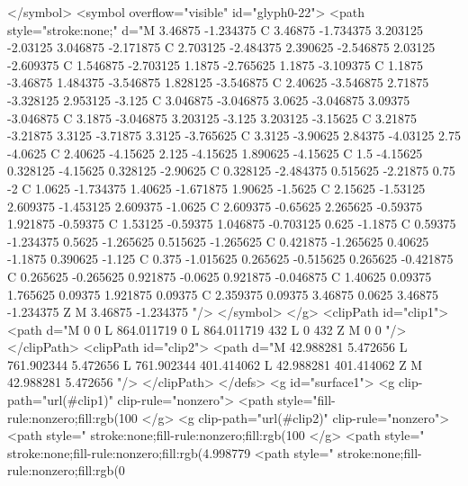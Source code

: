 </symbol>
<symbol overflow="visible" id="glyph0-22">
<path style="stroke:none;" d="M 3.46875 -1.234375 C 3.46875 -1.734375 3.203125 -2.03125 3.046875 -2.171875 C 2.703125 -2.484375 2.390625 -2.546875 2.03125 -2.609375 C 1.546875 -2.703125 1.1875 -2.765625 1.1875 -3.109375 C 1.1875 -3.46875 1.484375 -3.546875 1.828125 -3.546875 C 2.40625 -3.546875 2.71875 -3.328125 2.953125 -3.125 C 3.046875 -3.046875 3.0625 -3.046875 3.09375 -3.046875 C 3.1875 -3.046875 3.203125 -3.125 3.203125 -3.15625 C 3.21875 -3.21875 3.3125 -3.71875 3.3125 -3.765625 C 3.3125 -3.90625 2.84375 -4.03125 2.75 -4.0625 C 2.40625 -4.15625 2.125 -4.15625 1.890625 -4.15625 C 1.5 -4.15625 0.328125 -4.15625 0.328125 -2.90625 C 0.328125 -2.484375 0.515625 -2.21875 0.75 -2 C 1.0625 -1.734375 1.40625 -1.671875 1.90625 -1.5625 C 2.15625 -1.53125 2.609375 -1.453125 2.609375 -1.0625 C 2.609375 -0.65625 2.265625 -0.59375 1.921875 -0.59375 C 1.53125 -0.59375 1.046875 -0.703125 0.625 -1.1875 C 0.59375 -1.234375 0.5625 -1.265625 0.515625 -1.265625 C 0.421875 -1.265625 0.40625 -1.1875 0.390625 -1.125 C 0.375 -1.015625 0.265625 -0.515625 0.265625 -0.421875 C 0.265625 -0.265625 0.921875 -0.0625 0.921875 -0.046875 C 1.40625 0.09375 1.765625 0.09375 1.921875 0.09375 C 2.359375 0.09375 3.46875 0.0625 3.46875 -1.234375 Z M 3.46875 -1.234375 "/>
</symbol>
</g>
<clipPath id="clip1">
  <path d="M 0 0 L 864.011719 0 L 864.011719 432 L 0 432 Z M 0 0 "/>
</clipPath>
<clipPath id="clip2">
  <path d="M 42.988281 5.472656 L 761.902344 5.472656 L 761.902344 401.414062 L 42.988281 401.414062 Z M 42.988281 5.472656 "/>
</clipPath>
</defs>
<g id="surface1">
<g clip-path="url(#clip1)" clip-rule="nonzero">
<path style="fill-rule:nonzero;fill:rgb(100%
</g>
<g clip-path="url(#clip2)" clip-rule="nonzero">
<path style=" stroke:none;fill-rule:nonzero;fill:rgb(100%
</g>
<path style=" stroke:none;fill-rule:nonzero;fill:rgb(4.998779%
<path style=" stroke:none;fill-rule:nonzero;fill:rgb(0%
